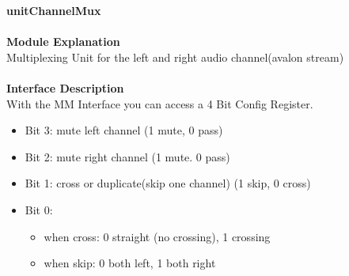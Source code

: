 \documentclass[../../../../doc/ASP-SoC_doc/main.tex]{subfiles}
\begin{document}
\textbf{unitChannelMux}
\\\\
\textbf{Module Explanation}
\\
Multiplexing Unit for the left and right audio channel(avalon stream)\\
\\
\textbf{Interface Description}
\\
With the MM Interface you can access a 4 Bit Config Register.\\
\begin{itemize}
\item Bit 3: mute left channel (1 mute, 0 pass)
\item Bit 2: mute right channel (1 mute. 0 pass)
\item Bit 1: cross or duplicate(skip one channel) (1 skip, 0 cross)
\item Bit 0: 
\begin{itemize}
\item when cross: 0 straight (no crossing), 1 crossing
\item when skip: 0 both left, 1 both right
\end{itemize}
\end{itemize}
\end{document}

